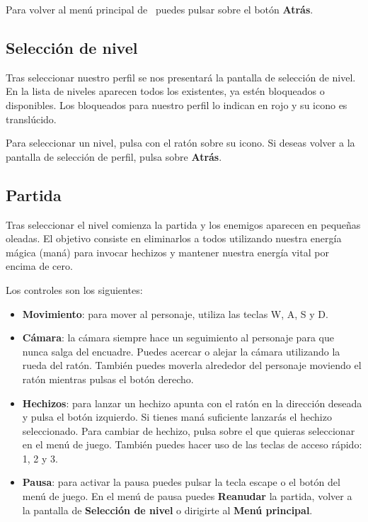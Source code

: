 \documentclass[a4paper,11pt]{article}
\begin{document}
Para volver al menú principal de \juego\ puedes pulsar sobre el botón
\textbf{Atrás}.


\subsection{Selección de nivel}
\label{sec:levelselection}

Tras seleccionar nuestro perfil se nos presentará la pantalla de selección
de nivel. En la lista de niveles aparecen todos los existentes, ya estén
bloqueados o disponibles. Los bloqueados para nuestro perfil lo indican
en rojo y su icono es translúcido.\\


Para seleccionar un nivel, pulsa con el ratón sobre su icono. Si deseas
volver a la pantalla de selección de perfil, pulsa sobre \textbf{Atrás}.

\subsection{Partida}

Tras seleccionar el nivel comienza la partida y los enemigos aparecen
en pequeñas oleadas. El objetivo consiste en eliminarlos a todos utilizando
nuestra energía mágica (maná) para invocar hechizos y mantener nuestra
energía vital por encima de cero.\\


Los controles son los siguientes:

\begin{itemize}
    \itemsep0em
    \item \textbf{Movimiento}: para mover al personaje, utiliza las teclas W, A, S y D.
    \item \textbf{Cámara}: la cámara siempre hace un seguimiento al personaje
    para que nunca salga del encuadre. Puedes acercar o alejar la cámara
    utilizando la rueda del ratón. También puedes moverla alrededor del
    personaje moviendo el ratón mientras pulsas el botón derecho.
    \item \textbf{Hechizos}: para lanzar un hechizo apunta con el ratón
    en la dirección deseada y pulsa el botón izquierdo. Si tienes maná suficiente
    lanzarás el hechizo seleccionado. Para cambiar de hechizo, pulsa
    sobre el que quieras seleccionar en el menú de juego. También puedes
    hacer uso de las teclas de acceso rápido: 1, 2 y 3.
    \item \textbf{Pausa}: para activar la pausa puedes pulsar la tecla
    escape o el botón del menú de juego. En el menú de pausa puedes \textbf{Reanudar}
    la partida, volver a la pantalla de \textbf{Selección de nivel} o dirigirte
    al \textbf{Menú principal}.
\end{itemize}
\end{document}
